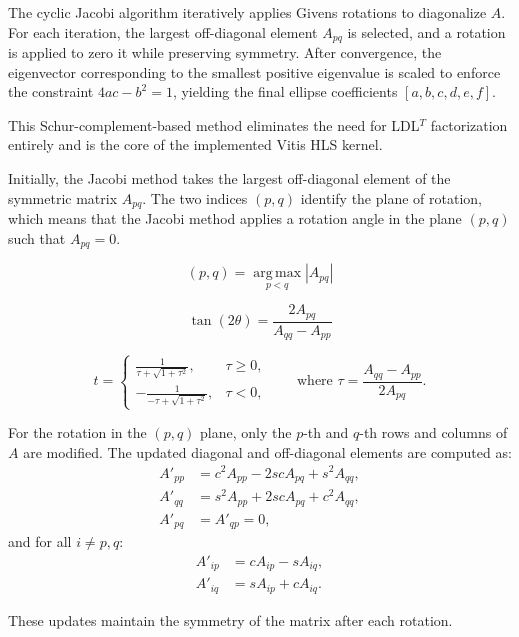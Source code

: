 \documentclass[11pt,a4paper]{article}
\begin{document}
The cyclic Jacobi algorithm iteratively applies Givens rotations to diagonalize \(A\). For each iteration, the largest off-diagonal element \(A_{pq}\) is selected, and a rotation is applied to zero it while preserving symmetry. After convergence, the eigenvector corresponding to the smallest positive eigenvalue is scaled to enforce the constraint \(4ac - b^2 = 1\), yielding the final ellipse coefficients \([a, b, c, d, e, f]\).

This Schur-complement-based method eliminates the need for LDL$^T$ factorization entirely and is the core of the implemented Vitis HLS kernel.
 
Initially, the Jacobi method takes the largest off-diagonal element of the symmetric matrix $A_{pq}$. The two indices $(p,q)$ identify the plane of rotation, which means that the Jacobi method applies a rotation angle in the plane $(p,q)$ such that $A_{pq}=0$.

\begin{equation}
(p, q) = \underset{p < q}{\operatorname{arg\,max}} |A_{pq}|
\end{equation}

\begin{equation}
\tan(2\theta) = \frac{2A_{pq}}{A_{qq} - A_{pp}}
\end{equation}

\begin{equation}
t =
\begin{cases}
\frac{1}{\tau + \sqrt{1 + \tau^{2}}}, & \tau \ge 0, \\[6pt]
-\frac{1}{-\tau + \sqrt{1 + \tau^{2}}}, & \tau < 0,
\end{cases}
\qquad
\text{where }
\tau = \frac{A_{qq} - A_{pp}}{2A_{pq}}.
\end{equation}

For the rotation in the $(p, q)$ plane, only the $p$-th and $q$-th rows and columns of $A$ are modified. 
The updated diagonal and off-diagonal elements are computed as:
\begin{align}
A'_{pp} &= c^{2}A_{pp} - 2scA_{pq} + s^{2}A_{qq}, \\
A'_{qq} &= s^{2}A_{pp} + 2scA_{pq} + c^{2}A_{qq}, \\
A'_{pq} &= A'_{qp} = 0,
\end{align}
and for all $i \neq p, q$:
\begin{align}
A'_{ip} &= cA_{ip} - sA_{iq}, \\
A'_{iq} &= sA_{ip} + cA_{iq}.
\end{align}

These updates maintain the symmetry of the matrix after each rotation.
\end{document}

